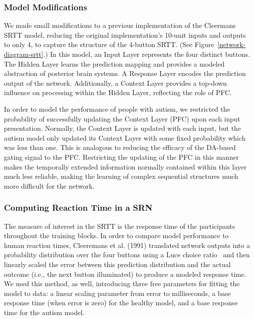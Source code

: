 \subsubsection{Model Modifications}
We made small modifications to a previous implementation of the Cleermans SRTT model, reducing the original implementation's 10-unit inputs and outputs to only 4, to capture the structure of the 4-button SRTT.  (See Figure~\ref{network-diagram-srtt}.)  In this model, an Input Layer represents the four distinct buttons.  The Hidden Layer learns the prediction mapping and provides a modeled abstraction of posterior brain systems.  A Response Layer encodes the prediction output of the network.  Additionally, a Context Layer provides a top-down influence on processing within the Hidden Layer, reflecting the role of PFC.

In order to model the performance of people with autism, we restricted the probability of successfully updating the Context Layer (PFC) upon each input presentation.  Normally, the Context Layer is updated with each input, but the autism model only updated its Context Layer with some fixed probability which was less than one.  This is analogous to reducing the efficacy of the DA-based gating signal to the PFC.  Restricting the updating of the PFC in this manner makes the temporally extended information normally contained within this layer much less reliable, making the learning of complex sequential structures much more difficult for the network.

\subsubsection{Computing Reaction Time in a SRN}
The measure of interest in the SRTT is the response time of the participants throughout the training blocks.  In order to compare model performance to human reaction times, Cleeremans et al. (1991) \nocite{Cleeremans:1991:SSRT} translated network outputs into a probability distribution over the four buttons using a Luce choice ratio~\cite{Luce:1963} and then linearly scaled the error between this prediction distribution and the actual outcome (i.e., the next button illuminated) to produce a modeled response time.  We used this method, as well, introducing three free parameters for fitting the model to data: a linear scaling parameter from error to milliseconds, a base response time (when error is zero) for the healthy model, and a base response time for the autism model.  

